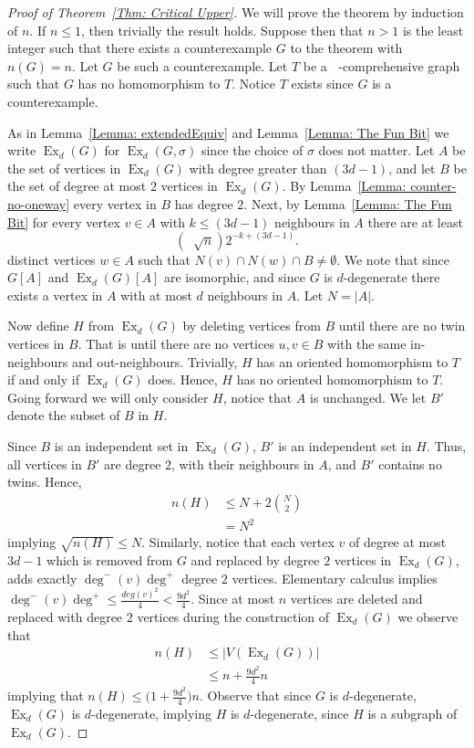 \documentclass[11pt]{article}
\theoremstyle{definition}
\DeclareMathOperator{\ex}{\text{Ex}}
\DeclareMathOperator{\coe}{6\Big(1+\frac{9d^2}{4}\Big)^{\frac{1}{2}}d}
\DeclareMathOperator{\bound}{\Big( 3d-1, \coe\sqrt{n}\Big)}
\begin{document}
\begin{proof}[Proof of Theorem~\ref{Thm: Critical Upper}]

We will prove the theorem by induction of $n$.
If $n\leq 1$, then trivially the result holds.
Suppose then that $n>1$ is the least integer such that
there exists a counterexample $G$ to the theorem with $n(G) = n$.
Let $G$ be such a counterexample.
Let $T$ be a $\bound$-comprehensive graph
such that $G$ has no homomorphism to $T$.
Notice $T$ exists since $G$ is a counterexample.

As in Lemma~\ref{Lemma: extendedEquiv} and Lemma~\ref{Lemma: The Fun Bit}
we write $\ex_d(G)$ for $\ex_d(G,\sigma)$ since the choice of $\sigma$ does not matter.
Let $A$ be the set of vertices in $\ex_d(G)$ with degree greater than $(3d-1)$,
and let $B$ be the set of degree at most $2$ vertices in $\ex_d(G)$.
By Lemma~\ref{Lemma: counter-no-oneway} every vertex in $B$ has degree $2$.
Next, 
by Lemma~\ref{Lemma: The Fun Bit} for every vertex $v \in A$ with $k \leq (3d-1)$ neighbours in 
$A$
there are at least
    \[
    (\coe\sqrt{n})2^{-k+(3d-1)}.
    \]
distinct vertices $w\in A$ such that $N(v)\cap N(w)\cap B \neq \emptyset$.
We note that since $G[A]$ and $\ex_d(G)[A]$ are isomorphic,
and since $G$ is $d$-degenerate there exists a vertex in $A$ with at most $d$ neighbours in $A$.
Let $N = |A|$.

Now define $H$ from $\ex_d(G)$ by deleting vertices from $B$ until there are no twin vertices in $B$.
That is until there are no vertices $u,v \in B$ with the same in-neighbours and out-neighbours.
Trivially, $H$ has an oriented homomorphism to $T$ if and only if $\ex_d(G)$ does.
Hence, $H$ has no oriented homomorphism to $T$.
Going forward we will only consider $H$, notice that $A$ is unchanged.
We let $B'$ denote the subset of $B$ in $H$.

Since $B$ is an independent set in $\ex_d(G)$, $B'$ is an independent set in $H$.
Thus, all vertices in $B'$ are degree $2$, with their neighbours in $A$, and $B'$ contains no twins.
Hence, 
\begin{align*}
    n(H) & \leq N +2\binom{N}{2}\\
    & = N^2
\end{align*}
implying $\sqrt{n(H)} \leq N$.
Similarly, notice that each vertex $v$ of degree at most $3d-1$ which is 
removed from $G$ and replaced by degree $2$ vertices in $\ex_d(G)$, 
adds exactly $\deg^-(v)\deg^+$ degree $2$ vertices.
Elementary calculus implies $\deg^-(v)\deg^+\leq \frac{deg(v)^2}{4} < \frac{9d^2}{4}$. 
Since at most $n$ vertices are deleted and replaced with degree $2$ vertices 
during the construction of $\ex_d(G)$ we observe that
\begin{align*}
    n(H) & \leq |V(\ex_d(G))| \\
    & \leq n + \frac{9d^2}{4}n
\end{align*}
implying that $n(H) \leq \Big(1+\frac{9d^2}{4}\Big)n$.
Observe that since $G$ is $d$-degenerate, $\ex_d(G)$ is $d$-degenerate, implying $H$ is $d$-degenerate, 
since $H$ is a subgraph of $\ex_d(G)$.



\end{proof}
\end{document}
